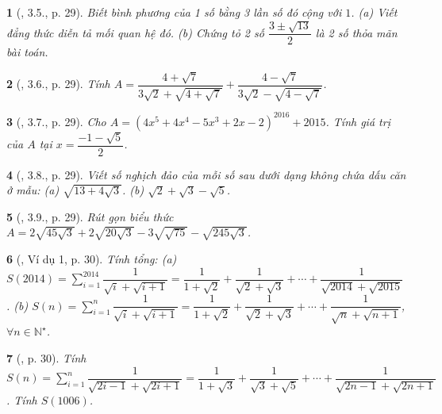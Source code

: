 \documentclass{article}
\newtheorem{baitoan}{}%
\begin{document}
\begin{baitoan}[\cite{Binh_boi_duong_Toan_9_tap_1}, 3.5., p. 29]
	Biết bình phương của 1 số bằng 3 lần số đó cộng với $1$. (a) Viết đẳng thức diễn tả mối quan hệ đó. (b) Chứng tỏ 2 số $\dfrac{3\pm\sqrt{13}}{2}$ là 2 số thỏa mãn bài toán.
\end{baitoan}

\begin{baitoan}[\cite{Binh_boi_duong_Toan_9_tap_1}, 3.6., p. 29]
	Tính $A = \dfrac{4 + \sqrt{7}}{3\sqrt{2} + \sqrt{4 + \sqrt{7}}} + \dfrac{4 - \sqrt{7}}{3\sqrt{2} - \sqrt{4 - \sqrt{7}}}$.
\end{baitoan}

\begin{baitoan}[\cite{Binh_boi_duong_Toan_9_tap_1}, 3.7., p. 29]
	Cho $A = (4x^5 + 4x^4 - 5x^3 + 2x - 2)^{2016} + 2015$. Tính giá trị của $A$ tại $x = \dfrac{-1 - \sqrt{5}}{2}$.
\end{baitoan}

\begin{baitoan}[\cite{Binh_boi_duong_Toan_9_tap_1}, 3.8., p. 29]
	Viết số nghịch đảo của mỗi số sau dưới dạng không chứa dấu căn ở mẫu: (a) $\sqrt{13 + 4\sqrt{3}}$. (b) $\sqrt{2} + \sqrt{3} - \sqrt{5}$.
\end{baitoan}

\begin{baitoan}[\cite{Binh_boi_duong_Toan_9_tap_1}, 3.9., p. 29]
	Rút gọn biểu thức $A = 2\sqrt{45\sqrt{3}} + 2\sqrt{20\sqrt{3}} - 3\sqrt{\sqrt{75}} - \sqrt{245\sqrt{3}}$.
\end{baitoan}

\begin{baitoan}[\cite{Binh_boi_duong_Toan_9_tap_1}, Ví dụ 1, p. 30]
	Tính tổng: (a) $S(2014) = \sum_{i=1}^{2014} \dfrac{1}{\sqrt{i} + \sqrt{i + 1}} = \dfrac{1}{1 + \sqrt{2}} + \dfrac{1}{\sqrt{2} + \sqrt{3}} + \cdots + \dfrac{1}{\sqrt{2014} + \sqrt{2015}}$. (b) $S(n) = \sum_{i=1}^n \dfrac{1}{\sqrt{i} + \sqrt{i + 1}} = \dfrac{1}{1 + \sqrt{2}} + \dfrac{1}{\sqrt{2} + \sqrt{3}} + \cdots + \dfrac{1}{\sqrt{n} + \sqrt{n + 1}}$, $\forall n\in\mathbb{N}^\star$.
\end{baitoan}

\begin{baitoan}[\cite{Binh_boi_duong_Toan_9_tap_1}, p. 30]
	Tính $S(n) = \sum_{i=1}^n \dfrac{1}{\sqrt{2i - 1} + \sqrt{2i + 1}} = \dfrac{1}{1 + \sqrt{3}} + \dfrac{1}{\sqrt{3} + \sqrt{5}} + \cdots + \dfrac{1}{\sqrt{2n - 1} + \sqrt{2n + 1}}$. Tính $S(1006)$.
\end{baitoan}
\end{document}
